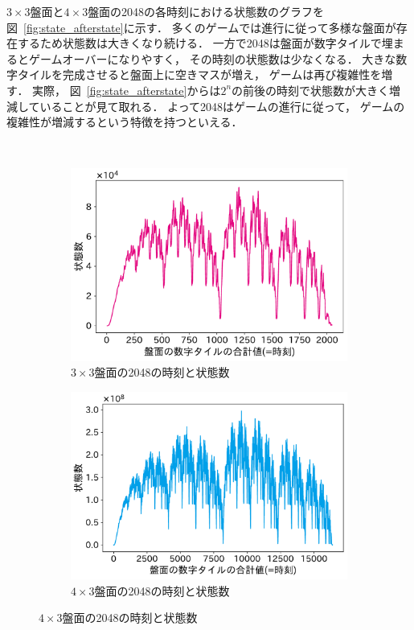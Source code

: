 $3\times3$盤面と$4\times3$盤面の2048の各時刻における状態数のグラフを図~\ref{fig:state_afterstate}に示す．
多くのゲームでは進行に従って多様な盤面が存在するため状態数は大きくなり続ける．
一方で2048は盤面が数字タイルで埋まるとゲームオーバーになりやすく， その時刻の状態数は少なくなる．
大きな数字タイルを完成させると盤面上に空きマスが増え， ゲームは再び複雑性を増す．
実際， 図~\ref{fig:state_afterstate}からは$2^n$の前後の時刻で状態数が大きく増減していることが見て取れる．
よって2048はゲームの進行に従って， ゲームの複雑性が増減するという特徴を持つといえる．
\begin{figure}　
\vspace{0.2cm}
\begin{subfigure}[T]{0.4\columnwidth}
    \centering
    \includegraphics[width=\columnwidth]{figures/graph_mini.pdf}
    \caption{$3\times3$盤面の2048の時刻と状態数}
    \label{fig:graph_mini}
\end{subfigure}
\hspace{1cm}
\begin{subfigure}[T]{0.4\columnwidth}
    \centering
    \includegraphics[width=\columnwidth]{figures/graph_mid.pdf}
    \caption{$4\times3$盤面の2048の時刻と状態数}
    \label{fig:graph_mid}
\end{subfigure}
\label{fig:time_state_num}
\end{figure}

